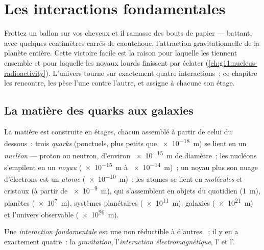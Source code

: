 \chapter{Les interactions fondamentales}\label{ch:g11:fundamental-interactions}

Frottez un ballon sur vos cheveux et il ramasse des bouts de papier ---
battant, avec quelques centimètres carrés de caoutchouc, l'attraction
gravitationnelle de la planète entière. Cette victoire facile est la
raison pour laquelle les  tiennent
ensemble et pour laquelle les noyaux lourds finissent par éclater
(\cref{ch:g11:nucleus-radioactivity}). L'univers tourne sur exactement
quatre interactions~; ce chapitre les rencontre, les pèse l'une contre
l'autre, et assigne à chacune son étage.

\section{La matière des quarks aux galaxies}

\begin{definition}\label{def:g11:fundamental-interactions:ladder}
La matière est construite en étages, chacun assemblé à partir de celui
du dessous~: trois \emph{quarks} (ponctuels, plus petits
que \qty{e-18}{m}) se lient en un \emph{nucléon} ---
proton ou neutron, d'environ \qty{e-15}{m} de diamètre~; les nucléons
s'empilent en un \emph{noyau} (\qty{e-15}{m} à
\qty{e-14}{m})~; un noyau plus son nuage d'électrons est un
\emph{atome} (\qty{e-10}{m})~; les atomes se lient en
\emph{molécules} et cristaux (à partir de \qty{e-9}{m}),
qui s'assemblent en objets du quotidien (\qty{1}{m}), planètes
(\qty{e7}{m}), systèmes planétaires (\qty{e11}{m}), galaxies
(\qty{e21}{m}) et l'univers observable (\qty{e26}{m}).
\end{definition}

\begin{definition}\label{def:g11:fundamental-interactions:four}
Une \emph{interaction fondamentale} est
une  non réductible à d'autres
~; il y en a exactement quatre~:
la \emph{gravitation}, l'\emph{interaction
électromagnétique},
l' et
l'.
\end{definition}

